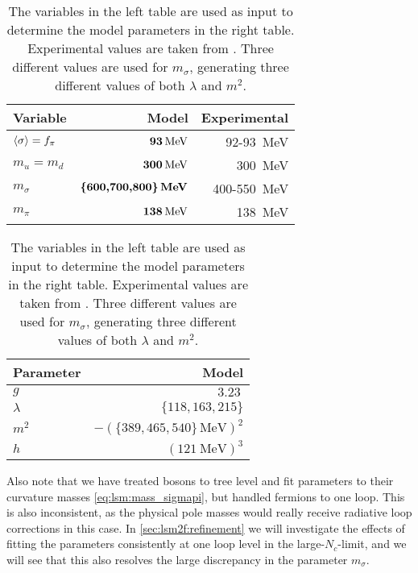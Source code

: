 \begin{table}[t]
\centering
\caption{\label{tab:lsm2f:parameters}%
The variables in the left table are used as input to determine the model parameters in the right table.
Experimental values are taken from \cite{ref:pdg_review_2021}.
Three different values are used for $m_\sigma$, generating three different values of both $\lambda$ and $m^2$.
}
\begin{tabular}{ l r r }
	\toprule
	Variable & Model                                   & Experimental       \\
	\midrule
	$\langle \sigma \rangle=f_\pi$ & $\textbf{\SI{93}{\mega\electronvolt}}$  & \SI{92}{}-\SI{93}{\mega\electronvolt} \\
	$m_u=m_d$            & $\textbf{\SI{300}{\mega\electronvolt}}$ & \approx \, \SI{300}{\mega\electronvolt} \\
	$m_\sigma$           & $\textbf{\{600,700,800\}\,\si{\mega\electronvolt}}$ & \SI{400}{}-\SI{550}{\mega\electronvolt}          \\
	$m_\pi$              & $\textbf{\SI{138}{\mega\electronvolt}}$ & \SI{138}{\mega\electronvolt}                     \\
	\bottomrule
\end{tabular}
\hfill
\begin{tabular}{ l r }
	\toprule
	Parameter   & Model                                 \\
	\midrule
	$g$         & $\SI{3.23}{}$                         \\
	$\lambda$   & $\{118,163,215\}$                        \\
	$m^2$       & $-(\{389,465,540\} \, \si{\mega\electronvolt})^2$ \\
	$h$         & $(\SI{121}{\mega\electronvolt})^3$  \\
	\bottomrule
\end{tabular}
\end{table}

Also note that we have treated bosons to tree level and fit parameters to their curvature masses \eqref{eq:lsm:mass_sigmapi},
but handled fermions to one loop. 
This is also inconsistent, as the physical pole masses would really receive radiative loop corrections in this case.
In \cref{sec:lsm2f:refinement} we will investigate the effects of fitting the parameters consistently at one loop level in the large-$N_c$-limit,
and we will see that this also resolves the large discrepancy in the parameter $m_\sigma$.

